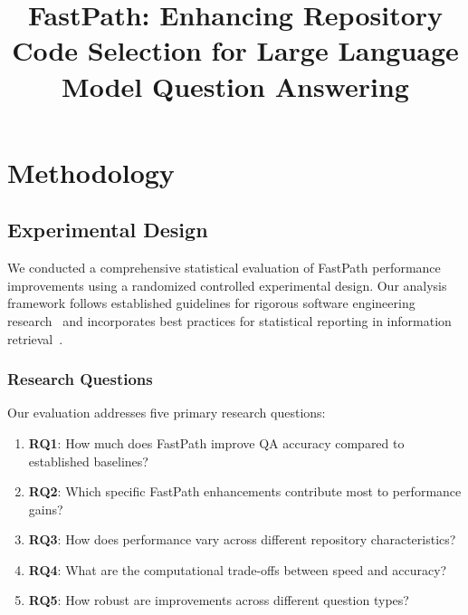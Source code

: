 \documentclass[conference]{IEEEtran}
\begin{document}
\title{FastPath: Enhancing Repository Code Selection for Large Language Model Question Answering}

\author{
}

\maketitle


\section{Methodology}
\label{sec:methodology}

\subsection{Experimental Design}
\label{subsec:experimental_design}

We conducted a comprehensive statistical evaluation of FastPath performance improvements using a randomized controlled experimental design. Our analysis framework follows established guidelines for rigorous software engineering research~\cite{wohlin2012experimentation} and incorporates best practices for statistical reporting in information retrieval~\cite{sanderson2010test}.

\subsubsection{Research Questions}
Our evaluation addresses five primary research questions:

\begin{enumerate}
    \item \textbf{RQ1}: How much does FastPath improve QA accuracy compared to established baselines?
    \item \textbf{RQ2}: Which specific FastPath enhancements contribute most to performance gains?
    \item \textbf{RQ3}: How does performance vary across different repository characteristics?
    \item \textbf{RQ4}: What are the computational trade-offs between speed and accuracy?
    \item \textbf{RQ5}: How robust are improvements across different question types?
\end{enumerate}
\end{document}
